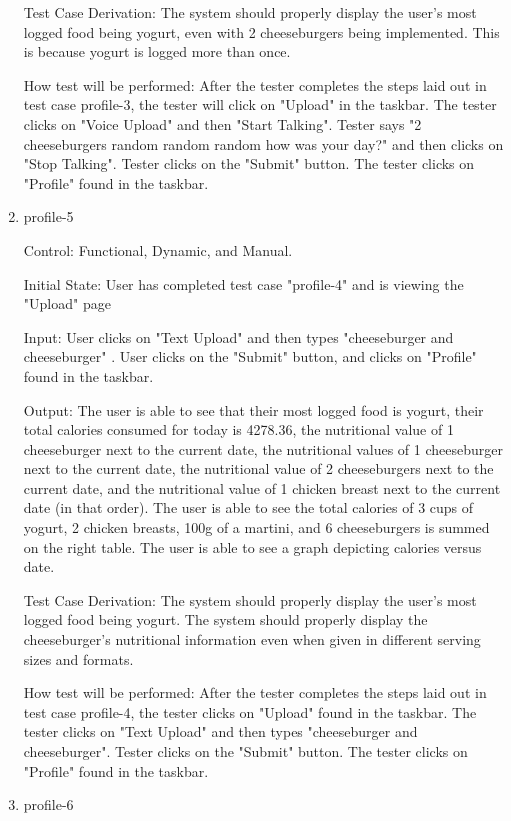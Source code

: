 \documentclass[12pt, titlepage]{article}
\begin{document}
\begin{enumerate}
		Test Case Derivation: The system should properly display the user's most logged food being yogurt, even with 2 cheeseburgers being implemented. This is because yogurt is logged more than once.
		
		How test will be performed: After the tester completes the steps laid out in test case profile-3, the tester will click on "Upload" in the taskbar. The tester clicks on "Voice Upload" and then "Start Talking". Tester says "2 cheeseburgers random random random how was your day?" and then clicks on "Stop Talking". Tester clicks on the "Submit" button. The tester clicks on "Profile" found in the taskbar.
		
		\item{profile-5\\}
		
		Control: Functional, Dynamic, and Manual.
		
		Initial State: User has completed test case "profile-4" and is viewing the "Upload" page
		
		Input: User clicks on "Text Upload" and then types "cheeseburger and cheeseburger" . User clicks on the "Submit" button, and clicks on "Profile" found in the taskbar.
		
		Output: The user is able to see that their most logged food is yogurt, their total calories consumed for today is 4278.36, the nutritional value of 1 cheeseburger next to the current date, the nutritional values of 1 cheeseburger next to the current date, the nutritional value of 2 cheeseburgers next to the current date, and the nutritional value of 1 chicken breast next to the current date (in that order). The user is able to see the total calories of 3 cups of yogurt, 2 chicken breasts, 100g of a martini, and 6 cheeseburgers is summed on the right table. The user is able to see a graph depicting calories versus date.
		
		Test Case Derivation: The system should properly display the user's most logged food being yogurt. The system should properly display the cheeseburger's nutritional information even when given in different serving sizes and formats.
		
		How test will be performed: After the tester completes the steps laid out in test case profile-4, the tester clicks on "Upload" found in the taskbar. The tester clicks on "Text Upload" and then types "cheeseburger and cheeseburger". Tester clicks on the "Submit" button. The tester clicks on "Profile" found in the taskbar.
		
		\item{profile-6\\}
		

\end{enumerate}
\end{document}
